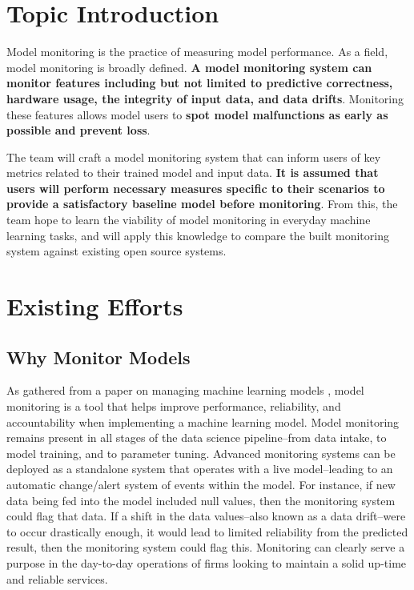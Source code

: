 \documentclass[
	letterpaper, %
	12pt, %
]{CSUniSchoolLabReport}
\begin{document}
\section{Topic Introduction}
Model monitoring is the practice of measuring model performance. As a field, model monitoring is broadly defined. \textbf{A model monitoring system can monitor features including but not limited to predictive correctness, hardware usage, the integrity of input data, and data drifts}. Monitoring these features allows model users to \textbf{spot model malfunctions as early as possible and prevent loss}. \par

The team will craft a model monitoring system that can inform users of key metrics related to their trained model and input data. \textbf{It is assumed that users will perform necessary measures specific to their scenarios to provide a satisfactory baseline model before monitoring}. From this, the team hope to learn the viability of model monitoring in everyday machine learning tasks, and will apply this knowledge to compare the built monitoring system against existing open source systems.


\section{Existing Efforts}
\subsection{Why Monitor Models}
As gathered from a paper on managing machine learning models \autocite{Vartak2018MODELDBOA}, model monitoring is a tool that helps improve performance, reliability, and accountability when implementing a machine learning model. Model monitoring remains present in all stages of the data science pipeline–from data intake, to model training, and to parameter tuning. Advanced monitoring systems can be deployed as a standalone system that operates with a live model–leading to an automatic change/alert system of events within the model. For instance, if new data being fed into the model included null values, then the monitoring system could flag that data. If a shift in the data values–also known as a data drift–were to occur drastically enough, it would lead to limited reliability from the predicted result, then the monitoring system could flag this. Monitoring can clearly serve a purpose in the day-to-day operations of firms looking to maintain a solid up-time and reliable services. \par
\end{document}
